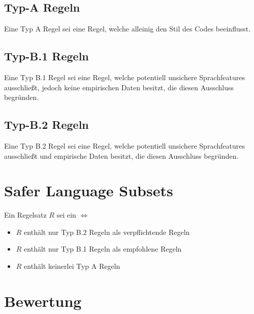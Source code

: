\documentclass[a4paper,UKenglish,cleveref, autoref]{templates/lipics-v2019}
\begin{document}
    \subsection{Typ-A Regeln}
    \label{subsec:typ-a-regeln}
    \begin{definition}
        Eine Typ A Regel sei eine Regel, welche alleinig den Stil des Codes beeinflusst.
    \end{definition}

    \subsection{Typ-B.1 Regeln}
    \label{subsec:typ-b-1-regeln}
    \begin{definition}
        Eine Typ B.1 Regel sei eine Regel, welche potentiell unsichere Sprachfeatures ausschließt,
        jedoch keine empirischen Daten besitzt, die diesen Ausschluss begründen.
    \end{definition}
    
    \subsection{Typ-B.2 Regeln}
    \label{subsec:typ-b-2-regeln}
    \begin{definition}
        Eine Typ B.2 Regel sei eine Regel, welche potentiell unsichere Sprachfeatures ausschließt und empirische
        Daten besitzt, die diesen Ausschluss begründen.
    \end{definition}
    
    \section{Safer Language Subsets}
    \label{sec:safer-language-subsets}
    \begin{definition}
        Ein Regelsatz $R$ sei ein \sls $\iff$
        \begin{itemize}
            \item $R$ enthält nur Typ B.2 Regeln als verpflichtende Regeln
            \item $R$ enthält nur Typ B.1 Regeln als empfohlene Regeln
            \item $R$ enthält keinerlei Typ A Regeln
        \end{itemize}
        
    \end{definition}
    
    \section{Bewertung}
    \label{sec:bewertung}
\end{document}
